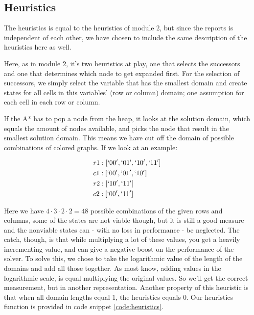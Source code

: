 \subsection{Heuristics}
The heuristics is equal to the heuristics of module 2, but since the reports is independent of each other, we have chosen to include the same description of the heuristics here as well.

Here, as in module 2, it's two heuristics at play, one that selects the successors and one that determines which node to get expanded first. For the selection of successors, we simply select the variable that has the smallest domain and create states for all cells in this variables' (row or column) domain; one assumption for each cell in each row or column.

If the A* has to pop a node from the heap, it looks at the solution domain, which equals the amount of nodes available, and picks the node that result in the smallest solution domain. This means we have cut off the domain of possible combinations of colored graphs. If we look at an example:

\begin{align*}
	&r1: [`00',`01',`10',`11']\\
	&c1: [`00',`01',`10']\\
	&r2: [`10',`11']\\
	&c2: [`00',`11']
\end{align*}

Here we have \(4 \cdot 3 \cdot 2 \cdot 2 = 48\) possible combinations of the given rows and columns, some of the states are not viable though, but it is still a good measure and the nonviable states can - with no loss in performance - be neglected. The catch, though, is that while multiplying a lot of these values, you get a heavily incrementing value, and can give a negative boost on the performance of the solver. To solve this, we chose to take the logarithmic value of the length of the domains and add all those together. As most know, adding values in the logarithmic scale, is equal multiplying the original values. So we'll get the correct measurement, but in another representation. Another property of this heuristic is that when all domain lengths equal 1, the heuristics equals 0. Our heuristics function is provided in code snippet \ref{code:heuristics}.



